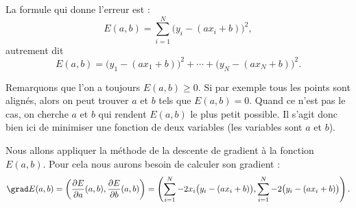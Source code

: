 
La formule qui donne l'erreur est :
$$E(a,b) = \sum_{i=1}^{N}\big(y_i - (ax_i+b)\big)^2,$$
autrement dit 
$$E(a,b) = \big(y_1 - (ax_1+b)\big)^2 + \cdots + \big(y_N - (ax_N+b)\big)^2.$$

Remarquons que l'on a toujours $E(a,b)\ge0$. Si par exemple tous les points sont alignés, alors on peut trouver $a$ et $b$ tels que $E(a,b)=0$. Quand ce n'est pas le cas, on cherche $a$ et $b$ qui rendent $E(a,b)$ le plus petit possible.
Il s'agit donc bien ici de minimiser une fonction de deux variables (les variables sont $a$ et $b$).

Nous allons appliquer la méthode de la descente de gradient à la fonction $E(a,b)$. Pour cela nous aurons besoin de calculer son gradient :
$$\grad E(a,b) 
= \left(\frac{\partial E}{\partial a}(a,b), \frac{\partial E}{\partial b}(a,b)\right)
= \left(
\sum_{i=1}^{N} -2x_i\big(y_i - (ax_i+b)\big),  
\sum_{i=1}^{N} -2\big(y_i - (ax_i+b)\big)
\right).$$


